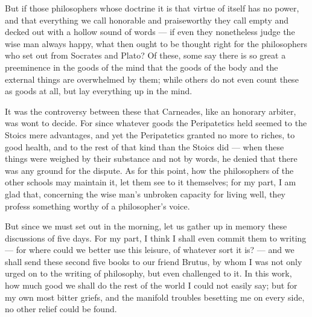  But if those philosophers whose doctrine it is that virtue of itself has no power, and that everything we call honorable and praiseworthy they call empty and decked out with a hollow sound of words — if even they nonetheless judge the wise man always happy, what then ought to be thought right for the philosophers who set out from Socrates and Plato? Of these, some say there is so great a preeminence in the goods of the mind that the goods of the body and the external things are overwhelmed by them; while others do not even count these as goods at all, but lay everything up in the mind.

 It was the controversy between these that Carneades, like an honorary arbiter, was wont to decide. For since whatever goods the Peripatetics held seemed to the Stoics mere advantages, and yet the Peripatetics granted no more to riches, to good health, and to the rest of that kind than the Stoics did — when these things were weighed by their substance and not by words, he denied that there was any ground for the dispute. As for this point, how the philosophers of the other schools may maintain it, let them see to it themselves; for my part, I am glad that, concerning the wise man's unbroken capacity for living well, they profess something worthy of a philosopher's voice.

 But since we must set out in the morning, let us gather up in memory these discussions of five days. For my part, I think I shall even commit them to writing — for where could we better use this leisure, of whatever sort it is? — and we shall send these second five books to our friend Brutus, by whom I was not only urged on to the writing of philosophy, but even challenged to it. In this work, how much good we shall do the rest of the world I could not easily say; but for my own most bitter griefs, and the manifold troubles besetting me on every side, no other relief could be found.
